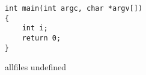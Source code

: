 \documentclass{article}
\begin{document}
\begin{CJK}{UTF8}{gbsn}     %

\else

\begin{lstlisting}
int main(int argc, char *argv[])
{
    int i;
    return 0;
}
\end{lstlisting}

\fi

\ifx allfiles undefined
\end{CJK}
\end{document}
